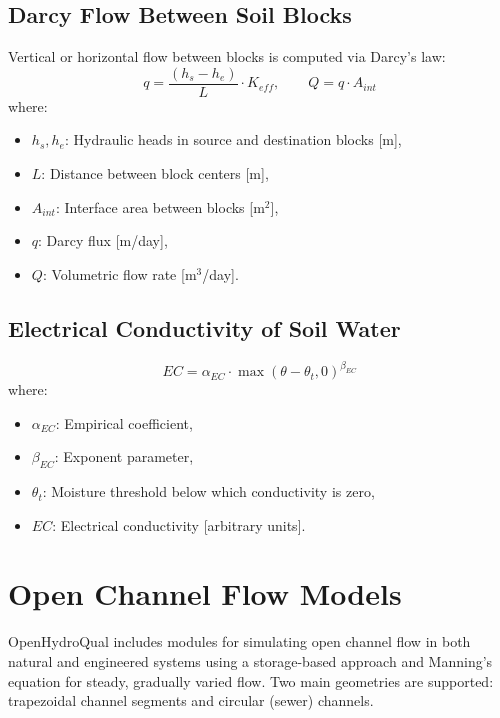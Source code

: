 \documentclass[12pt]{report}
\begin{document}
\section{Darcy Flow Between Soil Blocks}

Vertical or horizontal flow between blocks is computed via Darcy's law:
\begin{equation}
q = \frac{(h_s - h_e)}{L} \cdot K_{eff}, \qquad Q = q \cdot A_{int}
\end{equation}
where:
\begin{itemize}
\item $h_s, h_e$: Hydraulic heads in source and destination blocks [m],
\item $L$: Distance between block centers [m],
\item $A_{int}$: Interface area between blocks [m$^2$],
\item $q$: Darcy flux [m/day],
\item $Q$: Volumetric flow rate [m$^3$/day].
\end{itemize}

\section{Electrical Conductivity of Soil Water}

\begin{equation}
EC = \alpha_{EC} \cdot \max(\theta - \theta_t, 0)^{\beta_{EC}}
\end{equation}
where:
\begin{itemize}
\item $\alpha_{EC}$: Empirical coefficient,
\item $\beta_{EC}$: Exponent parameter,
\item $\theta_t$: Moisture threshold below which conductivity is zero,
\item $EC$: Electrical conductivity [arbitrary units].
\end{itemize}

\chapter{Open Channel Flow Models}

OpenHydroQual includes modules for simulating open channel flow in both natural and engineered systems using a storage-based approach and Manning's equation for steady, gradually varied flow. Two main geometries are supported: trapezoidal channel segments and circular (sewer) channels.
\end{document}

